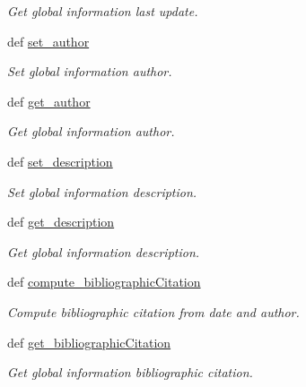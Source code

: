 \begin{DoxyCompactItemize}
\begin{DoxyCompactList}\small\item\em Get global information last update. \end{DoxyCompactList}\item 
def \hyperlink{classlmf_1_1src_1_1core_1_1global__information_1_1_global_information_a50e23e50d3ad0e6254c94446a829027a}{set\+\_\+author}
\begin{DoxyCompactList}\small\item\em Set global information author. \end{DoxyCompactList}\item 
def \hyperlink{classlmf_1_1src_1_1core_1_1global__information_1_1_global_information_ac689cff94234bacdc6c936cd7bcc2973}{get\+\_\+author}
\begin{DoxyCompactList}\small\item\em Get global information author. \end{DoxyCompactList}\item 
def \hyperlink{classlmf_1_1src_1_1core_1_1global__information_1_1_global_information_a9e6b98762af2465bf4babfa87bbd5ee8}{set\+\_\+description}
\begin{DoxyCompactList}\small\item\em Set global information description. \end{DoxyCompactList}\item 
def \hyperlink{classlmf_1_1src_1_1core_1_1global__information_1_1_global_information_af9c9b2b792546ea670838383492438f5}{get\+\_\+description}
\begin{DoxyCompactList}\small\item\em Get global information description. \end{DoxyCompactList}\item 
def \hyperlink{classlmf_1_1src_1_1core_1_1global__information_1_1_global_information_ac7395a0960ac17fb5a5d79b8dba66191}{compute\+\_\+bibliographic\+Citation}
\begin{DoxyCompactList}\small\item\em Compute bibliographic citation from date and author. \end{DoxyCompactList}\item 
def \hyperlink{classlmf_1_1src_1_1core_1_1global__information_1_1_global_information_a77753be672eef5626bd6c8deaa157a16}{get\+\_\+bibliographic\+Citation}
\begin{DoxyCompactList}\small\item\em Get global information bibliographic citation. \end{DoxyCompactList}\end{DoxyCompactItemize}
